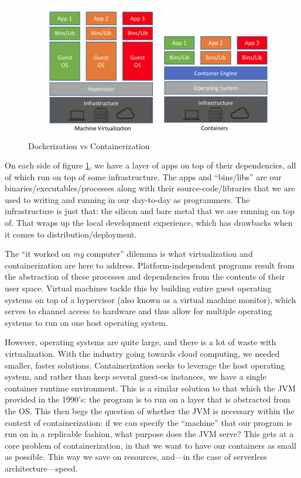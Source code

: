 \documentclass[11pt, twoside, reqno]{book}
\begin{document}
\begin{figure}[h!]
  \centering
  \includegraphics[width=125mm,scale=0.5]{dockerImage.png}
  
  \caption{Dockerization vs Containerization \cite{ScreenSh29:online}}
  \label{fig:docker}
\end{figure}

On each side of figure \ref{fig:docker}, we have a layer of apps on top of their dependencies, all of which run on top of some infrastructure. The apps and ``bins/libs'' are our binaries/executables/processes along with their source-code/libraries that we are used to writing and running in our day-to-day as programmers. The infrastructure is just that: the silicon and bare metal that we are running on top of. That wraps up the local development experience, which has drawbacks when it comes to distribution/deployment.

The ``it worked on \textit{my} computer'' dilemma is what virtualization and containerization are here to address. Platform-independent programs result from the abstraction of these processes and dependencies from the contents of their user space. Virtual machines tackle this by building entire guest operating systems on top of a hypervisor (also known as a virtual machine monitor), which serves to channel access to hardware and thus allow for multiple operating systems to run on one host operating system.

However, operating systems are quite large, and there is a lot of waste with virtualization. With the industry going towards cloud computing, we needed smaller, faster solutions. Containerization seeks to leverage the host operating system, and rather than keep several guest-os instances, we have a single container runtime environment. This is a similar solution to that which the JVM provided in the 1990's: the program is to run on a layer that is abstracted from the OS. This then begs the question of whether the JVM is necessary within the context of containerization: if we can specify the ``machine'' that our program is run on in a replicable fashion, what purpose does the JVM serve? This gets at a core problem of containerization, in that we want to have our containers as small as possible. This way we save on resources, and—in the case of serverless architecture—speed.
\end{document}
